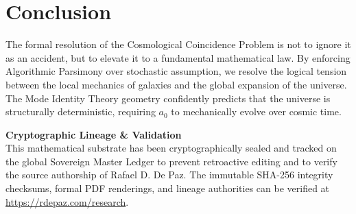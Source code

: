 \documentclass[12pt, a4paper]{article}
\theoremstyle{plain}
\theoremstyle{definition}
\theoremstyle{remark}
\begin{document}
\section{Conclusion}

The formal resolution of the Cosmological Coincidence Problem is not to ignore it as an accident, but to elevate it to a fundamental mathematical law. By enforcing Algorithmic Parsimony over stochastic assumption, we resolve the logical tension between the local mechanics of galaxies and the global expansion of the universe. The Mode Identity Theory geometry confidently predicts that the universe is structurally deterministic, requiring $a_0$ to mechanically evolve over cosmic time.

\vspace{2em}
\noindent\hrulefill
\vspace{1em}

\noindent\textbf{Cryptographic Lineage \& Validation}\\
This mathematical substrate has been cryptographically sealed and tracked on the global Sovereign Master Ledger to prevent retroactive editing and to verify the source authorship of Rafael D. De Paz. The immutable SHA-256 integrity checksums, formal PDF renderings, and lineage authorities can be verified at \url{https://rdepaz.com/research}.
\end{document}
